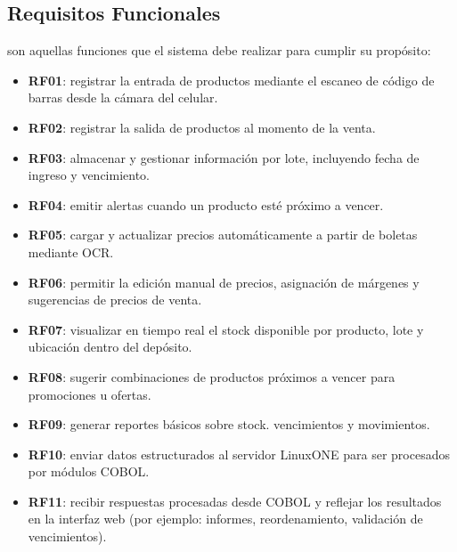 \documentclass[twoside]{article}
\begin{document}
\subsection{Requisitos Funcionales}
son aquellas funciones que el sistema debe realizar para cumplir su propósito:
\begin{itemize}
    \item \textbf{RF01}: registrar la entrada de productos mediante el escaneo de código de barras desde la cámara del celular.
    \item \textbf{RF02}: registrar la salida de productos al momento de la venta.
    \item \textbf{RF03}: almacenar y gestionar información por lote, incluyendo fecha de ingreso y vencimiento.
    \item \textbf{RF04}: emitir alertas cuando un producto esté próximo a vencer.
    \item \textbf{RF05}: cargar y actualizar precios automáticamente a partir de boletas mediante OCR.
    \item \textbf{RF06}: permitir la edición manual de precios, asignación de márgenes y sugerencias de precios de venta.
    \item \textbf{RF07}: visualizar en tiempo real el stock disponible por producto, lote y ubicación dentro del depósito.
    \item \textbf{RF08}: sugerir combinaciones de productos próximos a vencer para promociones u ofertas.
    \item \textbf{RF09}: generar reportes básicos sobre stock. vencimientos y movimientos.
    \item \textbf{RF10}: enviar datos estructurados al servidor LinuxONE para ser procesados por módulos COBOL.
    \item \textbf{RF11}: recibir respuestas procesadas desde COBOL y reflejar los resultados en la interfaz web (por ejemplo: informes, reordenamiento, validación de vencimientos).
\end{itemize}
\end{document}
